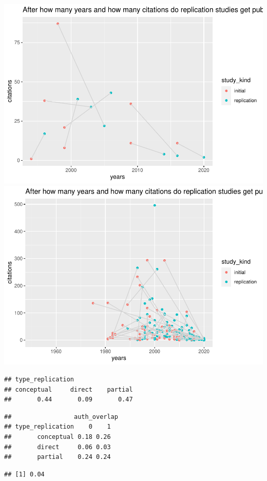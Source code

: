 \documentclass[]{elsarticle} %
\begin{document}
\includegraphics{ReplicationLing_files/figure-latex/plot cit and years direct-1.pdf}
\includegraphics{ReplicationLing_files/figure-latex/plot cit and years all-1.pdf}

\begin{verbatim}
## type_replication
## conceptual     direct    partial 
##       0.44       0.09       0.47
\end{verbatim}

\begin{verbatim}
##                 auth_overlap
## type_replication    0    1
##       conceptual 0.18 0.26
##       direct     0.06 0.03
##       partial    0.24 0.24
\end{verbatim}

\begin{verbatim}
## [1] 0.04
\end{verbatim}
\end{document}
